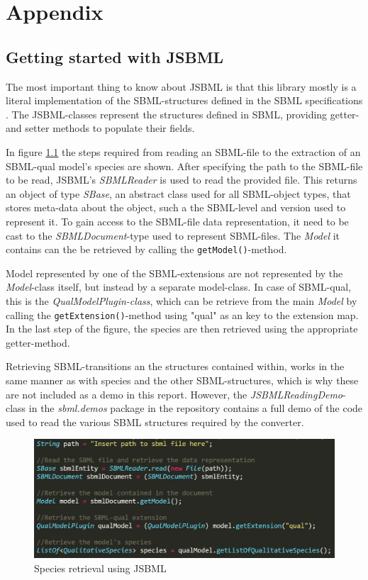 \chapter{Appendix}
\section{Getting started with JSBML}
The most important thing to know about JSBML is that this library mostly is a literal implementation of the SBML-structures defined in the SBML specifications \cite{hucka2018systems} \cite{sbmlqual2015}. The JSBML-classes represent the structures defined in SBML, providing getter- and setter methods to populate their fields.

In figure \ref{fig:JSBMLSpecies} the steps required from reading an SBML-file to the extraction of an SBML-qual model's species are shown. After specifying the path to the SBML-file to be read, JSBML's \emph{SBMLReader} is used to read the provided file. This returns an object of type \emph{SBase}, an abstract class used for all SBML-object types, that stores meta-data about the object, such a the SBML-level and version used to represent it. To gain access to the SBML-file data representation, it need to be cast to the \emph{SBMLDocument}-type used to represent SBML-files. The \emph{Model} it contains can the be retrieved by calling the \texttt{getModel()}-method.

Model represented by one of the SBML-extensions are not represented by the \emph{Model}-class itself, but instead by a separate model-class. In case of SBML-qual, this is the \emph{QualModelPlugin-class}, which can be retrieve from the main \emph{Model} by calling the \texttt{getExtension()}-method using "qual" as an key to the extension map. In the last step of the figure, the species are then retrieved using the appropriate getter-method.

Retrieving SBML-transitions an the structures contained within, works in the same manner as with species and the other SBML-structures, which is why these are not included as a demo in this report. However, the \emph{JSBMLReadingDemo}-class in the \emph{sbml.demos} package in the repository contains a full demo of the code used to read the various SBML structures required by the converter.

\begin{figure}[H]
    \centering
    \includegraphics[scale=0.60]{Sections/Images/JSBMLSpecies.JPG}
    \caption{Species retrieval using JSBML}
    \label{fig:JSBMLSpecies}
\end{figure}

